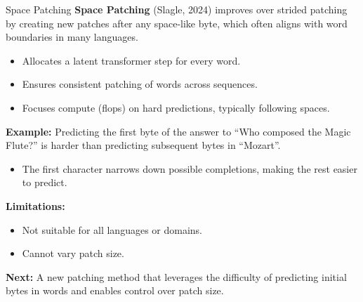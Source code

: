 \begin{frame}[allowframebreaks]{Space Patching}
    \textbf{Space Patching} (Slagle, 2024) improves over strided patching by creating new patches after any space-like byte, which often aligns with word boundaries in many languages.
    \begin{itemize}
        \item Allocates a latent transformer step for every word.
        \item Ensures consistent patching of words across sequences.
        \item Focuses compute (flops) on hard predictions, typically following spaces.
    \end{itemize}
    \vspace{1em}
    \textbf{Example:} Predicting the first byte of the answer to “Who composed the Magic Flute?” is harder than predicting subsequent bytes in “Mozart”.
    \begin{itemize}
        \item The first character narrows down possible completions, making the rest easier to predict.
    \end{itemize}
\framebreak
    \textbf{Limitations:}
    \begin{itemize}
        \item Not suitable for all languages or domains.
        \item Cannot vary patch size.
    \end{itemize}
    \vspace{1em}
    \textbf{Next:} A new patching method that leverages the difficulty of predicting initial bytes in words and enables control over patch size.
\end{frame}

